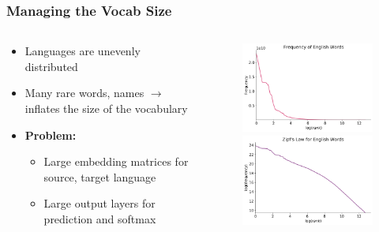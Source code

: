 \documentclass[usenames,dvipsnames]{beamer}
\begin{document}
\begin{frame}
\frametitle{Managing the Vocab Size}
\begin{columns}
  \begin{column}{0.45\textwidth}
    \begin{itemize}
      \item Languages are unevenly distributed
      \item Many rare words, names $\rightarrow$ inflates the size of the vocabulary
      \item \textbf{Problem:}
      \begin{itemize}
        \item Large embedding matrices for source, target language
        \item Large output layers for prediction and softmax
      \end{itemize}
    \end{itemize}
  \end{column}
  \begin{column}{0.45\textwidth}
    \begin{figure}
      \centering
      \includegraphics[width=4.5cm, valign=c]{assets/zipf}
      \vspace{5mm}
      \includegraphics[width=4.5cm, valign=c]{assets/zipf_log}
    \end{figure}
  \end{column}
\end{columns}
\end{frame}
\end{document}
